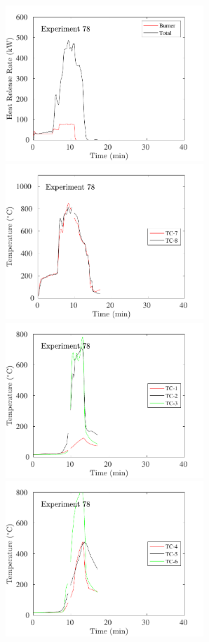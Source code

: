 \begin{figure}[H]
\includegraphics[height=2.30in]{../SCRIPT_FIGURES/Test_78_HRR} \hfill
\includegraphics[height=2.30in]{../SCRIPT_FIGURES/Test_78_TC_7-8} \\
\includegraphics[height=2.30in]{../SCRIPT_FIGURES/Test_78_TC_1-3} \hfill
\includegraphics[height=2.30in]{../SCRIPT_FIGURES/Test_78_TC_4-6}

\end{figure}
